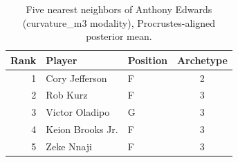 \begin{table}[htbp]
  \centering\small
  \begin{tabular}{rllc}
    \toprule
    Rank & Player & Position & Archetype \\
    \midrule
    1 & Cory Jefferson & F & 2 \\
    2 & Rob Kurz & F & 3 \\
    3 & Victor Oladipo & G & 3 \\
    4 & Keion Brooks Jr. & F & 3 \\
    5 & Zeke Nnaji & F & 3 \\
    \bottomrule
  \end{tabular}
  \caption{Five nearest neighbors of Anthony Edwards (curvature_m3 modality), Procrustes-aligned posterior mean.}
  \label{tab:Anthony_Edwards_neighbors_curvature_m3}
\end{table}

